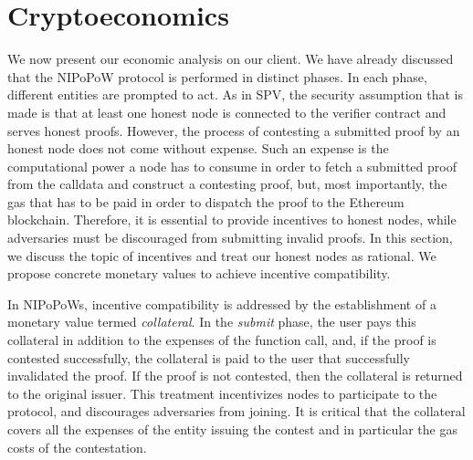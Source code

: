 \section{Cryptoeconomics}

We now present our economic analysis on our client. We have
already discussed that the NIPoPoW protocol is performed in distinct phases. In
each phase, different entities are prompted to act. As in SPV, the security
assumption that is made is that at least one honest node is connected to the
verifier contract and serves honest proofs. However, the process of contesting
a submitted proof by an honest node does not come without expense.  Such an
expense is the computational power a node has to consume in order to fetch a
submitted proof from the calldata and construct a contesting proof, but, most
importantly, the gas that has to be paid in order to dispatch the proof to
the Ethereum blockchain. Therefore, it is essential to provide incentives to
honest nodes, while adversaries must be discouraged from
submitting invalid proofs. In this section, we discuss the topic of incentives
and treat our honest nodes as rational. We propose concrete monetary values
to achieve incentive compatibility.

In NIPoPoWs, incentive compatibility is addressed by the establishment of a monetary value
termed \emph{collateral}. In the \emph{submit} phase, the user pays this collateral in
addition to the expenses of the function call, and, if the proof is contested
successfully, the collateral is paid to the user that successfully invalidated
the proof. If the proof is not contested, then the collateral is returned to
the original issuer. This treatment incentivizes nodes to participate to the
protocol, and discourages adversaries from joining. It is critical that the
collateral covers all the expenses of the entity issuing the contest and in
particular the gas costs of the contestation.

